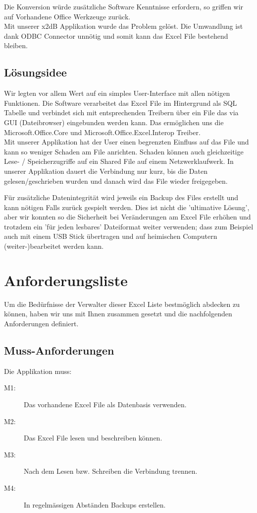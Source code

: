 \documentclass{article}
\begin{document}
Die Konversion würde zusätzliche Software Kenntnisse erfordern, so griffen wir auf Vorhandene Office Werkzeuge zurück. \\

Mit unserer x2dB Applikation wurde das Problem gelöst. Die Umwandlung ist dank ODBC Connector unnötig und somit kann das Excel File bestehend bleiben.

\subsection{Lösungsidee}
Wir legten vor allem Wert auf ein simples User-Interface mit allen nötigen Funktionen. Die Software verarbeitet das Excel File im Hintergrund als SQL Tabelle und verbindet sich mit entsprechenden Treibern über ein File das via GUI (Dateibrowser) eingebunden werden kann. Das ermöglichen uns die Microsoft.Office.Core und Microsoft.Office.Excel.Interop Treiber. \\

Mit unserer Applikation hat der User einen begrenzten Einfluss auf das File und kann so weniger Schaden am File anrichten. Schaden können auch gleichzeitige Lese- / Speicherzugriffe auf ein Shared File auf einem Netzwerklaufwerk. In unserer Applikation dauert die Verbindung nur kurz, bis die Daten gelesen/geschrieben wurden und danach wird das File wieder freigegeben.

Für zusätzliche Datenintegrität wird jeweils ein Backup des Files erstellt und kann nötigen Falls zurück gespielt werden. Dies ist nicht die 'ultimative Lösung', aber wir konnten so die Sicherheit bei Veränderungen am Excel File erhöhen und trotzdem ein 'für jeden lesbares' Dateiformat weiter verwenden; dass zum Beispiel auch mit einem USB Stick übertragen und auf heimischen Computern (weiter-)bearbeitet werden kann.

\section{Anforderungsliste}
Um die Bedürfnisse der Verwalter dieser Excel Liste bestmöglich abdecken zu können, haben wir uns mit Ihnen zusammen gesetzt und die nachfolgenden Anforderungen definiert. 
	
\subsection{Muss-Anforderungen}
Die Applikation muss:
	\begin{description}
		\item[M1:] Das vorhandene Excel File als Datenbasis verwenden.
		\item[M2:] Das Excel File lesen und beschreiben können.
		\item[M3:] Nach dem Lesen bzw. Schreiben die Verbindung trennen.
		\item[M4:] In regelmässigen Abständen Backups erstellen.
	\end{description}
\end{document}
